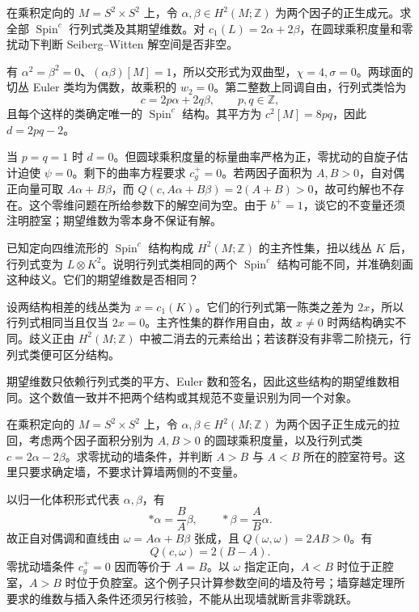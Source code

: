 \begin{exercise}\label{g3:ex:B-product-spinc-dimension}
 在乘积定向的 \(M=S^2\times S^2\) 上，令 \(\alpha,\beta\in H^2(M;\mathbb Z)\) 为两个因子的正生成元。求全部 \(\operatorname{Spin}^c\) 行列式类及其期望维数。对 \(c_1(L)=2\alpha+2\beta\)，在圆球乘积度量和零扰动下判断 Seiberg--Witten 解空间是否非空。
\end{exercise}
\begin{solution}
 有 \(\alpha^2=\beta^2=0\)、\((\alpha\beta)[M]=1\)，所以交形式为双曲型，\(\chi=4,\sigma=0\)。两球面的切丛 Euler 类均为偶数，故乘积的 \(w_2=0\)。第二整数上同调自由，行列式类恰为
 \[
  c=2p\alpha+2q\beta,\qquad p,q\in\mathbb Z,
 \]
 且每个这样的类确定唯一的 \(\operatorname{Spin}^c\) 结构。其平方为 \(c^2[M]=8pq\)，因此 \(d=2pq-2\)。

 当 \(p=q=1\) 时 \(d=0\)。但圆球乘积度量的标量曲率严格为正，零扰动的自旋子估计迫使 \(\psi=0\)。剩下的曲率方程要求 \(c_g^+=0\)。若两因子面积为 \(A,B>0\)，自对偶正向量可取 \(A\alpha+B\beta\)，而
 \(Q(c,A\alpha+B\beta)=2(A+B)>0\)，故可约解也不存在。这个零维问题在所给参数下的解空间为空。由于 \(b^+=1\)，谈它的不变量还须注明腔室；期望维数为零本身不保证有解。
\end{solution}

\begin{exercise}\label{g3:ex:B-spinc-two-torsion}
 已知定向四维流形的 \(\operatorname{Spin}^c\) 结构构成 \(H^2(M;\mathbb Z)\) 的主齐性集，扭以线丛 \(K\) 后，行列式变为 \(L\otimes K^2\)。说明行列式类相同的两个 \(\operatorname{Spin}^c\) 结构可能不同，并准确刻画这种歧义。它们的期望维数是否相同？
\end{exercise}
\begin{solution}
 设两结构相差的线丛类为 \(x=c_1(K)\)。它们的行列式第一陈类之差为 \(2x\)，所以行列式相同当且仅当 \(2x=0\)。主齐性集的群作用自由，故 \(x\ne0\) 时两结构确实不同。歧义正由 \(H^2(M;\mathbb Z)\) 中被二消去的元素给出；若该群没有非零二阶挠元，行列式类便可区分结构。

 期望维数只依赖行列式类的平方、Euler 数和签名，因此这些结构的期望维数相同。这个数值一致并不把两个结构或其规范不变量识别为同一个对象。
\end{solution}

\begin{exercise}\label{g3:ex:B-product-wall}
 在乘积定向的 \(M=S^2\times S^2\) 上，令 \(\alpha,\beta\in H^2(M;\mathbb Z)\) 为两个因子正生成元的拉回，考虑两个因子面积分别为 \(A,B>0\) 的圆球乘积度量，以及行列式类 \(c=2\alpha-2\beta\)。求零扰动的墙条件，并判断 \(A>B\) 与 \(A<B\) 所在的腔室符号。这里只要求确定墙，不要求计算墙两侧的不变量。
\end{exercise}
\begin{solution}
 以归一化体积形式代表 \(\alpha,\beta\)，有
 \[
  *\alpha=\frac BA\beta,\qquad *\beta=\frac AB\alpha.
 \]
 故正自对偶调和直线由 \(\omega=A\alpha+B\beta\) 张成，且 \(Q(\omega,\omega)=2AB>0\)。有
 \[
  Q(c,\omega)=2(B-A).
 \]
 零扰动墙条件 \(c_g^+=0\) 因而等价于 \(A=B\)。以 \(\omega\) 指定正向，\(A<B\) 时位于正腔室，\(A>B\) 时位于负腔室。这个例子只计算参数空间的墙及符号；墙穿越定理所要求的维数与插入条件还须另行核验，不能从出现墙就断言非零跳跃。
\end{solution}

